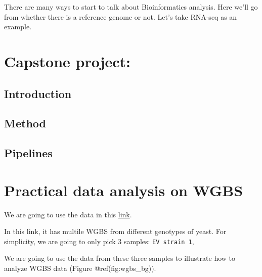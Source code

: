 \documentclass[]{book}
\begin{document}
There are many ways to start to talk about Bioinformatics analysis. Here we'll go from whether there is a reference genome or not. Let's take RNA-seq as an example.

\hypertarget{capstone-project}{%
\chapter{Capstone project:}\label{capstone-project}}

\hypertarget{introduction}{%
\section{Introduction}\label{introduction}}

\hypertarget{method}{%
\section{Method}\label{method}}

\hypertarget{pipelines}{%
\section{Pipelines}\label{pipelines}}

\hypertarget{section-7}{%
\section{}\label{section-7}}

\hypertarget{practical-data-analysis-on-wgbs}{%
\chapter{Practical data analysis on WGBS}\label{practical-data-analysis-on-wgbs}}

We are going to use the data in this \href{https://www.ncbi.nlm.nih.gov//geo/query/acc.cgi?acc=GSE66905}{link}.

In this link, it has multile WGBS from different genotypes of yeast. For simplicity, we are going to only pick 3 samples: \texttt{EV\ strain\ 1},

We are going to use the data from these three samples to illustrate how to analyze WGBS data (Figure @ref(fig:wgbs\_bg)).
\end{document}
